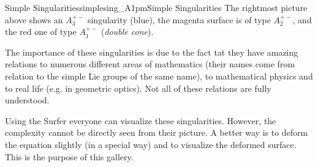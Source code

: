 \begin{surferIntroPage}{Simple Singularities}{simplesing_A1pm}{Simple Singularities}
    The rightmost picture above shows an $A_3^{+-}$ singularity (blue), the
    magenta surface is of type $A_2^{+-}$, and the red one of type $A_1^{+-}$
    (\emph{double cone}).
    
The importance of these singularities is due to the fact tat they have amazing relations to numerous different areas of mathematics (their names come from relation to the simple Lie groups of the same name), to mathematical physics and to real life (e.g. in geometric optics). Not all of these relations are fully understood.

Using the Surfer everyone can visualize these singularities. However, the complexity cannot be directly seen from their picture. A better way is to deform the equation slightly (in a special way) and to visualize the deformed surface. This is the purpose of this gallery.



\end{surferIntroPage}
